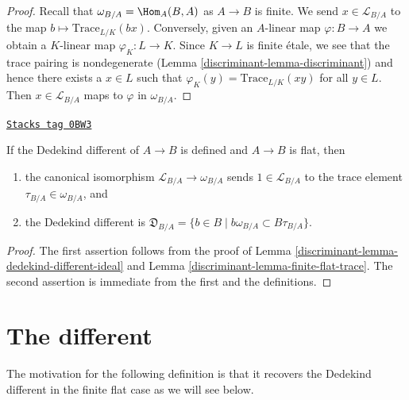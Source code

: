 \begin{proof}

Recall that $\omega_{B/A} = \Hom_A(B, A)$ as $A \to B$ is finite.
We send $x \in \mathcal{L}_{B/A}$ to the map
$b \mapsto \text{Trace}_{L/K}(bx)$.
Conversely, given an $A$-linear map $\varphi : B \to A$
we obtain a $K$-linear map $\varphi_K : L \to K$. Since $K \to L$ is finite
\'etale, we see that the trace pairing is nondegenerate
(Lemma \ref{discriminant-lemma-discriminant}) and hence there exists a $x \in L$ such that
$\varphi_K(y) = \text{Trace}_{L/K}(xy)$ for all $y \in L$.
Then $x \in \mathcal{L}_{B/A}$ maps to $\varphi$ in $\omega_{B/A}$.
\end{proof}

\begin{lemma}
\label{discriminant-lemma-flat-dedekind-complementary-module-trace}
\href{https://stacks.math.columbia.edu/tag/0BW3}{\texttt{Stacks tag 0BW3}}

If the Dedekind different of $A \to B$ is defined and $A \to B$ is flat, then
\begin{enumerate}
\item the canonical isomorphism $\mathcal{L}_{B/A} \to \omega_{B/A}$
sends $1 \in \mathcal{L}_{B/A}$ to the trace element
$\tau_{B/A} \in \omega_{B/A}$, and
\item the Dedekind different is
$\mathfrak{D}_{B/A} = \{b \in B \mid b\omega_{B/A} \subset B\tau_{B/A}\}$.
\end{enumerate}
\end{lemma}

\begin{proof}

The first assertion
follows from the proof of Lemma \ref{discriminant-lemma-dedekind-different-ideal}
and Lemma \ref{discriminant-lemma-finite-flat-trace}.
The second assertion is immediate from the first and the
definitions.
\end{proof}

\section{The different}
\label{discriminant-section-different}
The motivation for the following definition is that it recovers the
Dedekind different in the finite flat case as we will see below.

